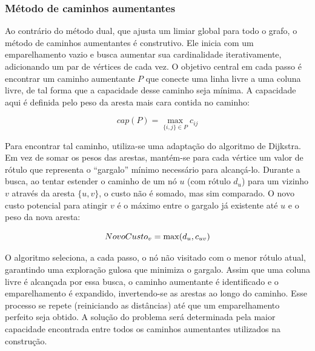 \subsubsection{Método de caminhos aumentantes}
\label{sec:caminhos_aumentantes_min_max}

Ao contrário do método dual, que ajusta um limiar global para todo o grafo, o método de caminhos aumentantes é construtivo. Ele inicia com um emparelhamento vazio e busca aumentar sua cardinalidade iterativamente, adicionando um par de vértices de cada vez. O objetivo central em cada passo é encontrar um caminho aumentante $P$ que conecte uma linha livre a uma coluna livre, de tal forma que a capacidade desse caminho seja mínima. A capacidade aqui é definida pelo peso da aresta mais cara contida no caminho:

\begin{equation}     
    cap(P) = \max_{\{i,j\} \in P} c_{ij} 
\end{equation}

Para encontrar tal caminho, utiliza-se uma adaptação do algoritmo de Dijkstra. Em vez de somar os pesos das arestas, mantém-se para cada vértice um valor de rótulo que representa o ``gargalo'' mínimo necessário para alcançá-lo. Durante a busca, ao tentar estender o caminho de um nó $u$ (com rótulo $d_u$) para um vizinho $v$ através da aresta $\{u,v\}$, o custo não é somado, mas sim comparado. O novo custo potencial para atingir $v$ é o máximo entre o gargalo já existente até $u$ e o peso da nova aresta:

\begin{equation}     
    Novo\space Custo_v = \max(d_u, c_{uv}) 
\end{equation}

O algoritmo seleciona, a cada passo, o nó não visitado com o menor rótulo atual, garantindo uma exploração gulosa que minimiza o gargalo. Assim que uma coluna livre é alcançada por essa busca, o caminho aumentante é identificado e o emparelhamento é expandido, invertendo-se as arestas ao longo do caminho. Esse processo se repete (reiniciando as distâncias) até que um emparelhamento perfeito seja obtido. A solução do problema será determinada pela maior capacidade encontrada entre todos os caminhos aumentantes utilizados na construção.

